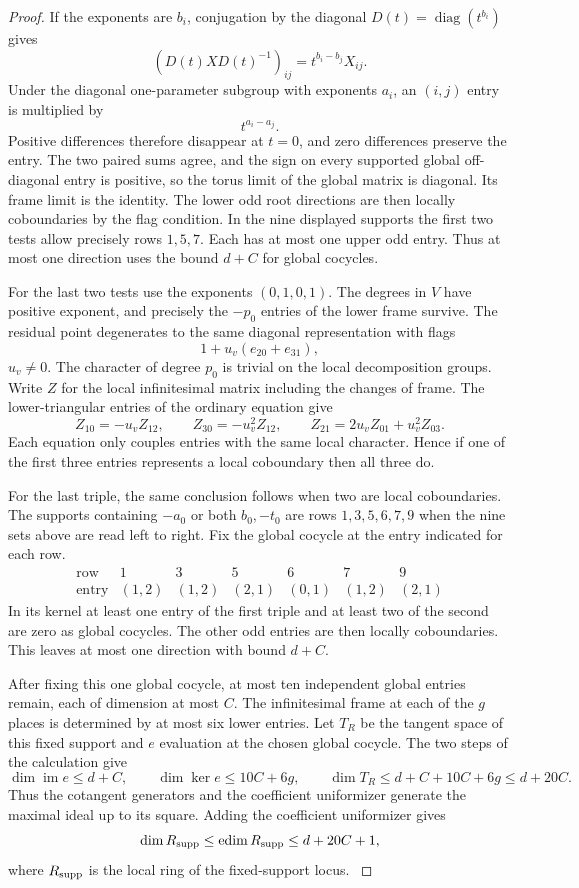 \begin{proof}
If the exponents are \(b_i\), conjugation by the diagonal \(D(t)=\operatorname{diag}(t^{b_i})\) gives
\[
 (D(t)XD(t)^{-1})_{ij}=t^{b_i-b_j}X_{ij}.
\]
Under the diagonal one-parameter subgroup with exponents \(a_i\), an \((i,j)\) entry is multiplied by
\[
 t^{a_i-a_j}.
\]
Positive differences therefore disappear at \(t=0\), and zero differences preserve the entry. The two paired sums agree, and the
sign on every supported global off-diagonal entry is
positive, so the torus limit of the global matrix is diagonal.
Its frame limit is the identity. The lower odd root directions are then locally
coboundaries by the flag condition. In the nine displayed
supports the first two tests allow precisely rows \(1,5,7\).
Each has at most one upper odd entry. Thus at most one
direction uses the bound \(d+C\) for global cocycles.

For the last two tests use the exponents \((0,1,0,1)\).
The degrees in \(V\) have positive exponent, and precisely
the \(-p_0\) entries of the lower frame survive. The residual
point degenerates to the same diagonal representation with
flags
\[
 1+u_v(e_{20}+e_{31}),
\]
\(u_v\ne0\). The character
of degree \(p_0\) is trivial on the local decomposition
groups. Write \(Z\) for the local infinitesimal matrix
including the changes of frame. The lower-triangular
entries of the ordinary equation give
\[
 Z_{10}=-u_v Z_{12},\qquad Z_{30}=-u_v^2 Z_{12},
 \qquad Z_{21}=2u_v Z_{01}+u_v^2 Z_{03}.
\]
Each equation only couples entries with the same local
character. Hence if one of the first three entries
represents a local coboundary then all three do.

For the
last triple, the same conclusion follows when two are
local coboundaries. The supports containing \(-a_0\)
or both \(b_0,-t_0\) are rows \(1,3,5,6,7,9\)
when the nine sets above are read left to right. Fix the global cocycle at the entry indicated for each row.
\[
 \begin{array}{c|rrrrrr}
 \text{row}&1&3&5&6&7&9\\ \hline
 \text{entry}&(1,2)&(1,2)&(2,1)&(0,1)&(1,2)&(2,1)
 \end{array}
\]
In its kernel at least one entry of the first triple and at least two of the second are zero as global cocycles. The other
odd entries are then locally coboundaries. This leaves
at most one direction with bound \(d+C\).

After fixing this one global cocycle, at most ten
independent global entries remain, each of dimension
at most \(C\). The infinitesimal frame at each of the
\(g\) places is determined by at most six lower entries.
Let \(T_R\) be the tangent space of this fixed support
and \(e\) evaluation at the chosen global cocycle. The
two steps of the calculation give
\[
 \dim \operatorname{im} e\le d+C,\qquad
 \dim\ker e\le10C+6g,\qquad
 \dim T_R\le d+C+10C+6g\le d+20C .
\]
Thus the cotangent generators and the coefficient uniformizer
generate the maximal ideal up to its square. Adding the coefficient uniformizer gives
\[
            \dim R_{\rm supp}\le\operatorname{edim}R_{\rm supp}
                        \le d+20C+1,
\]
where \(R_{\rm supp}\) is the local ring of the fixed-support locus.
\hfill\mbox{\cite{ferrero-washington}}\label{cor:ordinary-promodularity-5}


\end{proof}
